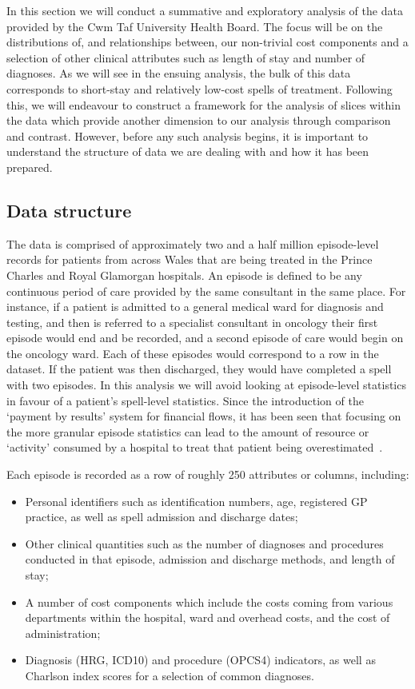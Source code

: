 In this section we will conduct a summative and exploratory analysis of the data
provided by the Cwm Taf University Health Board. The focus will be on the
distributions of, and relationships between, our non-trivial cost components
and a selection of other clinical attributes such as length of stay and number
of diagnoses. As we will see in the ensuing analysis, the bulk of this data
corresponds to short-stay and relatively low-cost spells of treatment. Following
this, we will endeavour to construct a framework for the analysis of slices
within the data which provide another dimension to our analysis through
comparison and contrast. However, before any such analysis begins, it is
important to understand the structure of data we are dealing with and how it has
been prepared.

\subsection{Data structure}\label{subsec:structure}

The data is comprised of approximately two and a half million episode-level
records for patients from across Wales that are being treated in the Prince
Charles and Royal Glamorgan hospitals. An episode is defined to be any
continuous period of care provided by the same consultant in the same place. For
instance, if a patient is admitted to a general medical ward for diagnosis and
testing, and then is referred to a specialist consultant in oncology their first
episode would end and be recorded, and a second episode of care would begin on
the oncology ward. Each of these episodes would correspond to a row in the
dataset. If the patient was then discharged, they would have completed a spell
with two episodes. In this analysis we will avoid looking at episode-level
statistics in favour of a patient's spell-level statistics. Since the
introduction of the `payment by results' system for financial flows, it has been
seen that focusing on the more granular episode statistics can lead to the
amount of resource or `activity' consumed by a hospital to treat that patient
being overestimated~\cite{BMJ2004}.

Each episode is recorded as a row of roughly 250 attributes or columns,
including:

\begin{itemize}
    \item Personal identifiers such as identification numbers, age, registered
        GP practice, as well as spell admission and discharge dates;
    \item Other clinical quantities such as the number of diagnoses and
        procedures conducted in that episode, admission and discharge methods,
        and length of stay;
    \item A number of cost components which include the costs coming from
        various departments within the hospital, ward and overhead costs, and
        the cost of administration;
    \item Diagnosis (HRG, ICD10) and procedure (OPCS4) indicators, as well as
        Charlson index scores for a selection of common diagnoses.
\end{itemize}

